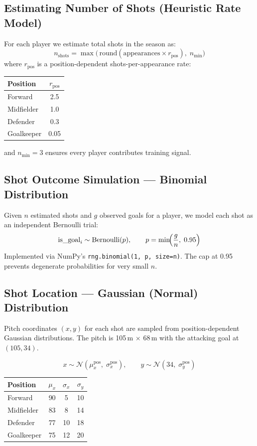 \documentclass[11pt,a4paper]{article}
\begin{document}
\subsection{Estimating Number of Shots (Heuristic Rate Model)}

For each player we estimate total shots in the season as:
\[
  n_{\text{shots}} = \max\!\bigl(\,\text{round}(\text{appearances}
    \times r_{\text{pos}}),\; n_{\min}\bigr)
\]
where $r_{\text{pos}}$ is a position-dependent shots-per-appearance rate:

\begin{center}
\begin{tabular}{lc}
  \toprule
  Position   & $r_{\text{pos}}$ \\
  \midrule
  Forward    & 2.5  \\
  Midfielder & 1.0  \\
  Defender   & 0.3  \\
  Goalkeeper & 0.05 \\
  \bottomrule
\end{tabular}
\end{center}

and $n_{\min}=3$ ensures every player contributes training signal.

\subsection{Shot Outcome Simulation --- Binomial Distribution}

Given $n$ estimated shots and $g$ observed goals for a player, we model
each shot as an independent Bernoulli trial:
\[
  \text{is\_goal}_i \sim \mathrm{Bernoulli}(p), \qquad
  p = \min\!\Bigl(\frac{g}{n},\; 0.95\Bigr)
\]
Implemented via NumPy's \texttt{rng.binomial(1, p, size=n)}.  The cap at
0.95 prevents degenerate probabilities for very small $n$.

\subsection{Shot Location --- Gaussian (Normal) Distribution}

Pitch coordinates $(x, y)$ for each shot are sampled from position-dependent
Gaussian distributions.  The pitch is 105\,m $\times$ 68\,m with the
attacking goal at $(105, 34)$.

\[
  x \sim \mathcal{N}(\mu_x^{\text{pos}},\;\sigma_x^{\text{pos}}), \qquad
  y \sim \mathcal{N}(34,\;\sigma_y^{\text{pos}})
\]

\begin{center}
\begin{tabular}{lccc}
  \toprule
  Position   & $\mu_x$ & $\sigma_x$ & $\sigma_y$ \\
  \midrule
  Forward    & 90  & 5  & 10 \\
  Midfielder & 83  & 8  & 14 \\
  Defender   & 77  & 10 & 18 \\
  Goalkeeper & 75  & 12 & 20 \\
  \bottomrule
\end{tabular}
\end{center}
\end{document}
